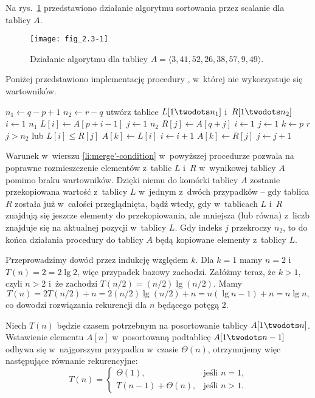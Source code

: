 
\exercise %
Na rys.\ \ref{fig:2.3-1} przedstawiono działanie algorytmu sortowania przez scalanie dla tablicy $A$.
\begin{figure}[ht]
	\centering \texttt{[image: fig\_2.3-1]}
	\caption{Działanie algorytmu  dla tablicy $A=\langle3,41,52,26,38,57,9,49\rangle$.} \label{fig:2.3-1}
\end{figure}

\exercise %
Poniżej przedstawiono implementację procedury , w~której nie wykorzystuje się wartowników.
\begin{codebox}
\li	$n_1\gets q-p+1$
\li	$n_2\gets r-q$
\li	utwórz tablice $L[1\twodots n_1]$ i~$R[1\twodots n_2]$
\li	\For $i\gets1$ \To $n_1$
\li		\Do $L[i]\gets A[p+i-1]$
		\End
\li	\For $j\gets1$ \To $n_2$
\li		\Do $R[j]\gets A[q+j]$
		\End
\li	$i\gets1$
\li $j\gets1$
\li \For $k\gets p$ \To $r$
\li		\Do
			\If $j>n_2$ lub $L[i]\le R[j]$ \label{li:merge'-condition}
\li				\Then
					$A[k]\gets L[i]$
\li					$i\gets i+1$
\li				\Else
					$A[k]\gets R[j]$
\li					$j\gets j+1$
				\End
		\End
\end{codebox}
Warunek w~wierszu \ref{li:merge'-condition} w~powyższej procedurze pozwala na poprawne rozmieszczenie elementów z~tablic $L$ i~$R$ w~wynikowej tablicy $A$ pomimo braku wartowników.
Dzięki niemu do  komórki tablicy $A$ zostanie przekopiowana wartość z~tablicy $L$ w~jednym z~dwóch przypadków -- gdy tablica $R$ została już w~całości przeglądnięta, bądź wtedy, gdy w~tablicach $L$ i~$R$ znajdują się jeszcze elementy do przekopiowania, ale mniejsza (lub równa) z~liczb znajduje się na aktualnej pozycji w~tablicy $L$.
Gdy indeks $j$ przekroczy $n_2$, to do końca działania procedury do tablicy $A$ będą kopiowane elementy z~tablicy $L$.

\exercise %
Przeprowadzimy dowód przez indukcję względem $k$.
Dla $k=1$ mamy $n=2$ i~$T(n)=2=2\lg2$, więc przypadek bazowy zachodzi.
Załóżmy teraz, że $k>1$, czyli $n>2$ i~że zachodzi $T(n/2)=(n/2)\lg(n/2)$.
Mamy
\[
	T(n) = 2T(n/2)+n = 2(n/2)\lg(n/2)+n = n(\lg n-1)+n = n\lg n,
\]
co dowodzi rozwiązania rekurencji dla $n$ będącego potęgą 2.

\exercise %
Niech $T(n)$ będzie czasem potrzebnym na posortowanie tablicy $A[1\twodots n]$.
Wstawienie elementu $A[n]$ w~posortowaną podtablicę $A[1\twodots n-1]$ odbywa się w~najgorszym przypadku w~czasie $\Theta(n)$, otrzymujemy więc następujące równanie rekurencyjne:
\[
	T(n) =
	\begin{cases}
		\Theta(1), & \text{jeśli $n=1$}, \\
		T(n-1)+\Theta(n), & \text{jeśli $n>1$}.
	\end{cases}
\]

